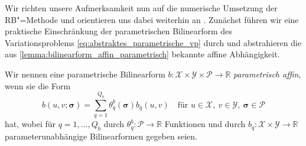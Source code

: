 \documentclass[../main.tex]{subfiles}
\begin{document}
Wir richten unsere Aufmerksamkeit nun auf die numerische Umsetzung der RB"=Methode und orientieren uns dabei weiterhin an \cite{Rozza2008,Patera:2007un}.
Zunächst führen wir eine praktische Einschränkung der parametrischen Bilinearform des Variationsproblems \cref{eq:abstraktes_parametrische_vp} durch und abstrahieren die aus \cref{lemma:bilinearform_affin_parametrisch} bekannte affine Abhängigkeit.

\begin{Definition}
\label{definition:parametrisch_affine_bf_fuer_rbm}
    Wir nennen eine parametrische Bilinearform $b \colon \mathcal X \times \mathcal Y \times \mathcal P \to \mathbb{R}$ \emph{parametrisch affin}, wenn sie die Form
    \begin{equation}\label{eq:bilinearform_parametrisch_affin}
        b(u, v; \bm \sigma) = \sum_{q = 1}^{Q_{b}} \theta_{q}^{b}(\bm \sigma) b_{q}(u, v) \quad \text{für } u \in \mathcal X,~v \in \mathcal Y,~\bm \sigma \in \mathcal P
    \end{equation}
    hat, wobei für $q = 1, \dots, Q_{b}$ durch $\theta_{q}^{b} \colon \mathcal P \to \mathbb{R}$ Funktionen und durch $b_{q} \colon \mathcal X \times \mathcal Y \to \mathbb{R}$ parameterunabhängige Bilinearformen gegeben seien.
\end{Definition}
\end{document}
